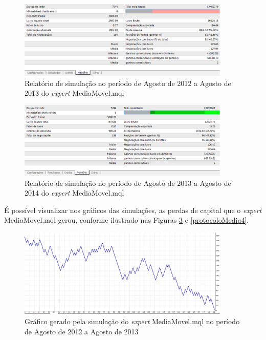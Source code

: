 \begin{figure}[H]
\centering
\includegraphics[width=0.9\textwidth]{figuras/protocoloMedia}
\caption{Relatório de simulação no período de Agosto de 2012 a Agosto de 2013 do \textit{expert} MediaMovel.mql} 
\label{protocoloMedia}
\end{figure}

\begin{figure}[H]
\centering
\includegraphics[width=0.9\textwidth]{figuras/protocoloMedia2}
\caption{Relatório de simulação no período de Agosto de 2013 a Agosto de 2014 do \textit{expert} MediaMovel.mql} 
\label{protocoloMedia2}
\end{figure}

É possível visualizar nos gráficos das simulações, as perdas de capital que o \textit{expert} MediaMovel.mql gerou, conforme ilustrado nas Figuras \ref{protocoloMedia3} e \ref{protocoloMedia4}.

\begin{figure}[H]
\centering
\includegraphics[width=0.9\textwidth]{figuras/protocoloMedia3}
\caption{ Gráfico gerado pela simulação do \textit{expert} MediaMovel.mql no período de Agosto de 2012 a Agosto de 2013} 
\label{protocoloMedia3}
\end{figure}

